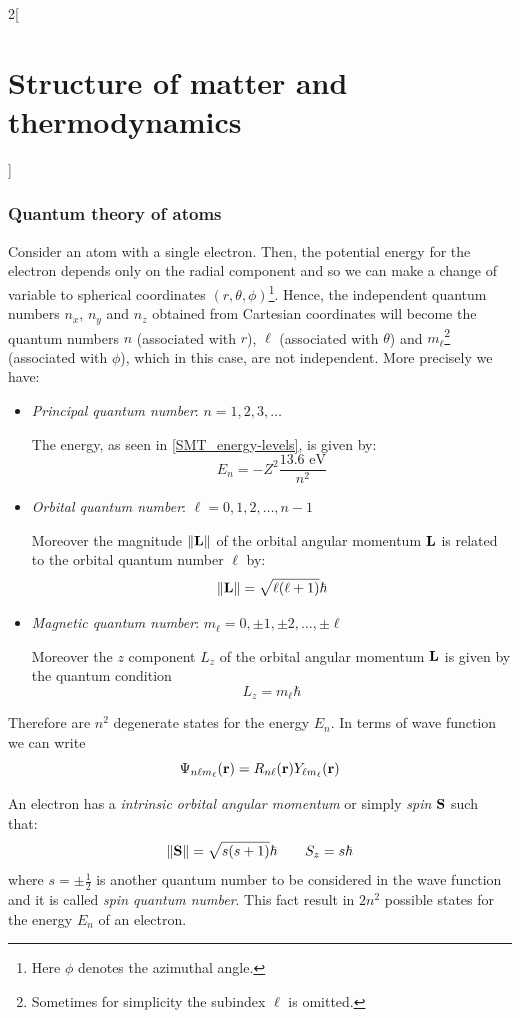 \documentclass[../../../main_physics.tex]{subfiles}
\begin{document}
\begin{multicols}{2}[\section{Structure of matter and thermodynamics}]
  \subsubsection{Quantum theory of atoms}
  \begin{definition}
    Consider an atom with a single electron. Then, the potential energy for the electron depends only on the radial component and so we can make a change of variable to spherical coordinates $(r,\theta,\phi)$\footnote{Here $\phi$ denotes the azimuthal angle.}. Hence, the independent quantum numbers $n_x$, $n_y$ and $n_z$ obtained from Cartesian coordinates will become the quantum numbers $n$ (associated with $r$), $\ell$ (associated with $\theta$) and $m_\ell$\footnote{Sometimes for simplicity the subindex $\ell$ is omitted.} (associated with $\phi$), which in this case, are not independent. More precisely we have:
    \begin{itemize}
      \item \emph{Principal quantum number}: $n=1,2,3,\ldots$\par
            The energy, as seen in \cref{SMT_energy-levels}, is given by: $$E_n=-Z^2\frac{13.6\text{ eV}}{n^2}$$
      \item \emph{Orbital quantum number}: $\ell=0,1,2,\ldots,n-1$\par Moreover the magnitude $\|\boldsymbol{\mathrm{L}}\|$ of the orbital angular momentum $\boldsymbol{\mathrm{L}}$ is related to the orbital quantum number $\ell$ by: $$\|\boldsymbol{\mathrm{L}}\|=\sqrt{\ell(\ell+1)}\hbar$$
      \item \emph{Magnetic quantum number}: $m_\ell=0,\pm 1,\pm 2,\ldots,\pm\ell$\par
            Moreover the $z$ component $L_z$ of the orbital angular momentum $\boldsymbol{\mathrm{L}}$ is given by the quantum condition $$L_z=m_\ell\hbar$$
    \end{itemize}
    Therefore are $n^2$ degenerate states for the energy $E_n$.
    In terms of wave function we can write $$\Psi_{n\ell m_\ell}(\boldsymbol{\mathrm{r}})=R_{n\ell}(\boldsymbol{\mathrm{r}})Y_{\ell m_\ell}(\boldsymbol{\mathrm{r}})$$
  \end{definition}
  \begin{definition}[Spin]
    An electron has a \emph{intrinsic orbital angular momentum} or simply \emph{spin} $\boldsymbol{\mathrm{S}}$ such that:
    $$\|\boldsymbol{\mathrm{S}}\|=\sqrt{s(s+1)}\hbar\qquad S_z=s\hbar$$ where $s=\pm\frac{1}{2}$ is another quantum number  to be considered in the wave function and it is called \emph{spin quantum number}. This fact result in $2n^2$ possible states for the energy $E_n$ of an electron.

\end{definition}
\end{multicols}
\end{document}
